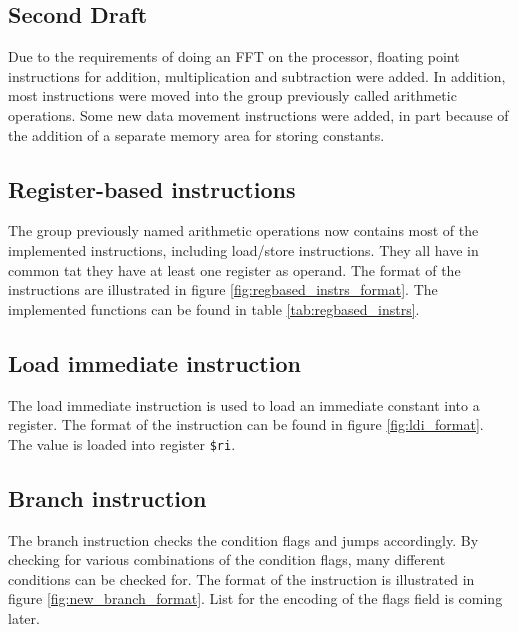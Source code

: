 


\FloatBarrier
\subsection{Second Draft}

Due to the requirements of doing an FFT on the processor, floating point
instructions for addition, multiplication and subtraction were added.
In addition, most instructions were moved into the group previously called
arithmetic operations. Some new data movement instructions were added, in part
because of the addition of a separate memory area for storing constants.

\subsection{Register-based instructions}

The group previously named arithmetic operations now contains most of the
implemented instructions, including load/store instructions. They all have
in common tat they have at least one register as operand. The format of the
instructions are illustrated in figure \ref{fig:regbased_instrs_format}. The
implemented functions can be found in table \ref{tab:regbased_instrs}.




\subsection{Load immediate instruction}
The load immediate instruction is used to load an immediate constant into a
register. The format of the instruction can be found in figure
\ref{fig:ldi_format}. The value is loaded into register \texttt{\$ri}.



\subsection{Branch instruction}
The branch instruction checks the condition flags and jumps accordingly. By
checking for various combinations of the condition flags, many different
conditions can be checked for. The format of the instruction is illustrated
in figure \ref{fig:new_branch_format}. List for the encoding of the flags field
is coming later.

